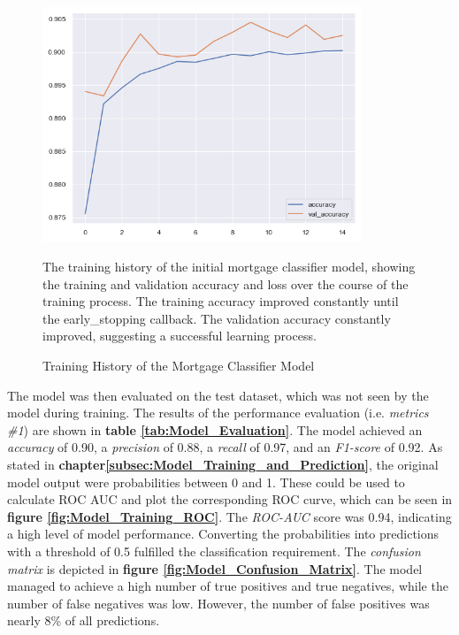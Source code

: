 \begin{figure}
    \centering
    \includegraphics[width=0.85\textwidth]{images/Model_Training/Initial_Training_History.png}
    \caption{Training History of the Mortgage Classifier Model}
    \medskip
    \small
    The training history of the initial mortgage classifier model, showing the training and validation accuracy and loss over the course of the training process. The training accuracy improved constantly until the early\_stopping callback. The validation accuracy constantly improved, suggesting a successful learning process.
    \label{fig:Model_Training_History}
\end{figure}

The model was then evaluated on the test dataset, which was not seen by the model during training. The results of the performance evaluation (i.e. \textit{metrics \#1}) are shown in \textbf{table \ref{tab:Model_Evaluation}}. The model achieved an \textit{accuracy} of 0.90, a \textit{precision} of 0.88, a \textit{recall} of 0.97, and an \textit{F1-score} of 0.92. 
As stated in \textbf{chapter\ref{subsec:Model_Training_and_Prediction}}, the original model output were probabilities between 0 and 1. These could be used to calculate ROC AUC and plot the corresponding ROC curve, which can be seen in \textbf{figure \ref{fig:Model_Training_ROC}}. The \textit{ROC-AUC} score was 0.94, indicating a high level of model performance. 
Converting the probabilities into predictions with a threshold of 0.5 fulfilled the classification requirement. The \textit{confusion matrix} is depicted in \textbf{figure \ref{fig:Model_Confusion_Matrix}}. The model managed to achieve a high number of true positives and true negatives, while the number of false negatives was low. However, the number of false positives was nearly 8\% of all predictions.

